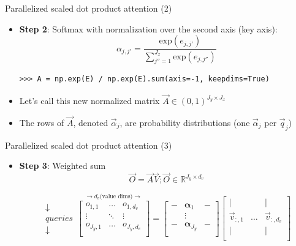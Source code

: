 \begin{vbframe}{Parallelized scaled dot product attention (2)}

\vfill

\begin{itemize}
\item \textbf{Step 2}: Softmax with normalization over the second axis (key axis): 
$$\alpha_{j,j'} = \frac{\mathrm{exp}(e_{j,j'})}{\sum_{j''=1}^{J_x} \mathrm{exp}(e_{j,j''})}$$
\begin{verbatim}
>>> A = np.exp(E) / np.exp(E).sum(axis=-1, keepdims=True)
\end{verbatim}
\item Let's call this new normalized matrix $\vec A \in (0,1)^{J_y \times J_x}$
\item The rows of $\vec A$, denoted $\vec \alpha_j$, are probability distributions (one $\vec \alpha_j$ per $\vec q_j$)
\end{itemize}

\vfill

\end{vbframe}


\begin{vbframe}{Parallelized scaled dot product attention (3)}

\vfill

\begin{itemize}
\item \textbf{Step 3}: Weighted sum
$$\vec {O} = \vec {A} \vec {V}; \vec O \in \mathbb{R}^{J_y \times d_v}$$

$$
\begin{matrix} \downarrow \\ queries \\ \downarrow \end{matrix}
	\overset{\rightarrow d_v \text{(value dims)} \rightarrow}{
\begin{bmatrix}
o_{1,1} & \ldots & o_{1,d_v} \\
\vdots & \ddots & \vdots \\
o_{J_y,1} & \ldots & o_{J_y,d_v} \\
\end{bmatrix}} =
\begin{bmatrix} 
- & \boldsymbol \alpha_1  & -  \\
& \vdots & \\
-  & \boldsymbol \alpha_{J_y}  &  -  \\
\end{bmatrix}  
\begin{bmatrix} 
\lvert &  & \lvert  \\
\vec {v}_{:,1} & \ldots & \vec {v}_{:,d_v} \\
\lvert &  & \lvert  \\
\end{bmatrix}
$$
\end{itemize}

\vfill

\end{vbframe}

